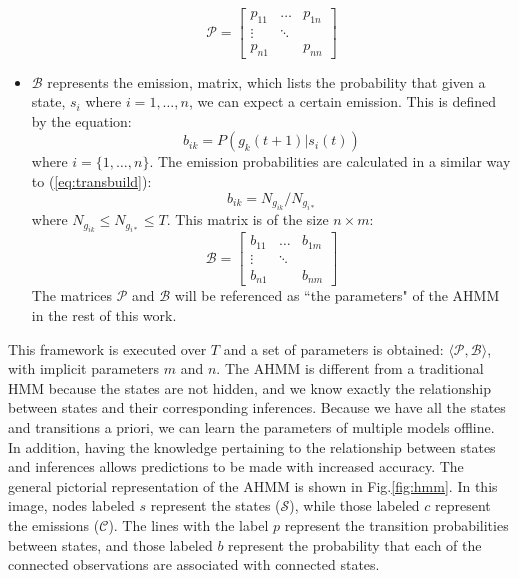 \documentclass[conference]{IEEEtran}
\newcommand\NB[1]{$\spadesuit$\footnote{NB: #1}}
\begin{document}
\begin{itemize}
        \begin{equation}
            \mathcal{P} = 
                    \begin{bmatrix}
                        p_{11} & \dots & p_{1n} \\
                        \vdots & \ddots & \\
                        p_{n1} &    & p_{nn}
                    \end{bmatrix}
        \end{equation}
    \item $\mathcal{B}$ represents the emission, matrix, which lists the probability that given a state, $s_i$ where $i = 1,\ldots,n$, we can expect a certain emission. This is defined by the equation:
        \begin{equation} \label{eq:obsref}
            b_{ik} = P(g_k(t+1) \vert s_i(t))
        \end{equation}
        where $i = \{1,\ldots,n\}$. The emission probabilities are calculated in a similar way to (\ref{eq:transbuild}):
        \begin{equation} \label{eq:obsbuild}
            b_{ik} = N_{g_{ik}}/N_{g_{i*}}
        \end{equation} 
        where $N_{g_{ik}} \leq N_{g_{i*}} \leq T$. This matrix is of the size $n\times m$:
        \begin{equation}
            \mathcal{B} = 
                    \begin{bmatrix}
                        b_{11} & \dots & b_{1m} \\
                        \vdots & \ddots & \\
                        b_{n1} &    & b_{nm}
                    \end{bmatrix}
        \end{equation}
        The matrices $\mathcal{P}$ and $\mathcal{B}$ will be referenced as ``the parameters" of the AHMM in the rest of this work. 
\end{itemize}

This framework is executed over $T$ and a set of parameters is obtained: $\langle \mathcal{P}, \mathcal{B} \rangle$, with implicit parameters $m$ and $n$. The AHMM is different from a traditional HMM because the states are not hidden, and we know exactly the relationship
between states and their corresponding inferences. Because we have all the states and transitions a priori, we can learn the parameters of multiple models offline. In addition, having the knowledge pertaining to the relationship between states and inferences allows predictions to be made with increased accuracy.
The general pictorial representation of the AHMM is shown in Fig.\ref{fig:hmm}. In this image, nodes labeled $s$ represent the states ($\mathcal{S}$), while those labeled $c$ represent the emissions ($\mathcal{C}$). The lines with the label $p$ represent the transition probabilities between states, and those labeled $b$ represent the probability that each of the connected observations are associated with connected states.
\end{document}

